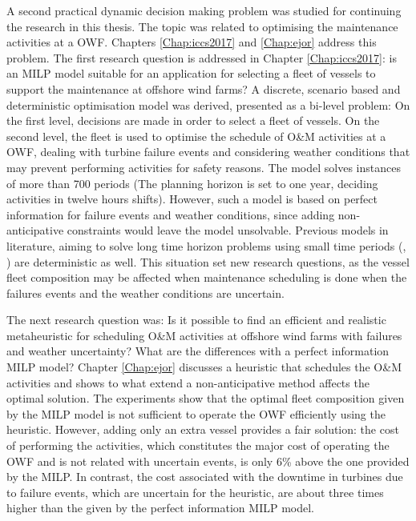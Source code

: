 
A second practical dynamic decision making problem was studied for continuing the research in this thesis. The topic was related to optimising the maintenance activities at a OWF. Chapters \ref{Chap:iccs2017} and \ref{Chap:ejor} address this problem. The first research question is addressed in Chapter \ref{Chap:iccs2017}: is an MILP model suitable for an application for selecting a fleet of vessels to support the maintenance at offshore wind farms? A discrete, scenario based and deterministic optimisation model was derived, presented as a bi-level problem: On the first level, decisions are made in order to select a fleet of vessels. On the second level, the fleet is used to optimise the schedule of O\&M activities at a OWF, dealing with turbine failure events and considering weather conditions that may prevent performing activities for safety reasons. The model solves instances of more than 700 periods (The planning horizon is set to one year, deciding activities in twelve hours shifts). However, such a model is based on perfect information for failure events and weather conditions, since adding non-anticipative constraints would leave the model unsolvable. Previous models in literature, aiming to solve long time horizon problems using small time periods (\cite{HALVORSENWEARE2013}, \cite{Stalhane2016357}) are deterministic as well. This situation set new research questions, as the vessel fleet composition may be affected when maintenance scheduling is done when the failures events and the weather conditions are uncertain. 

The next research question was: Is it possible to find an efficient and realistic metaheuristic for scheduling O\&M activities at offshore wind farms with failures and weather uncertainty? What are the differences with a perfect information MILP model? Chapter \ref{Chap:ejor} discusses a heuristic that schedules the O\&M activities and shows to what extend a non-anticipative method affects the optimal solution. The experiments show that the optimal fleet composition given by the MILP model is not sufficient to operate the OWF efficiently using the heuristic. However, adding only an extra vessel provides a fair solution: the cost of performing the activities, which constitutes the major cost of operating the OWF and is not related with uncertain events, is only  6\% above the one provided by the MILP. In contrast, the cost associated with the downtime in turbines due to failure events, which are uncertain for the heuristic, are about three times higher than the given by the perfect information MILP model.



